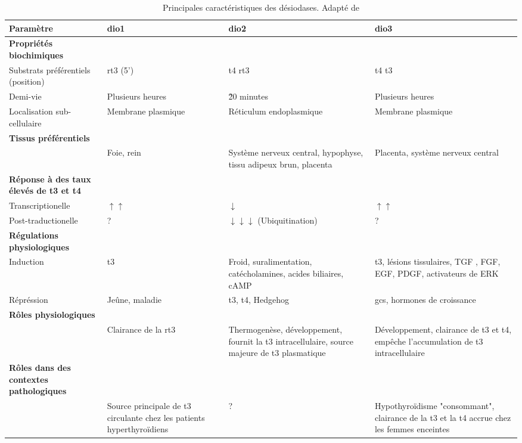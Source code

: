 \begin{sidewaystable}[!htbp]
{
\footnotesize
{}
\begin{tabularx}{\textwidth}{L L L L}

\toprule

\textbf{Paramètre} &
	\textbf{\gls{dio1}} &
	\textbf{\gls{dio2}} &
	\textbf{\gls{dio3}} \\

\midrule

\textbf{Propriétés biochimiques} & ~ & ~ & ~ \\
	Substrats préférentiels (position) &
		\gls{rt3} (5') &
		\gls{t4} \gls{rt3} &
		\gls{t4} \gls{t3} \\
	Demi-vie &
		Plusieurs heures &
		\~ 20 minutes &
		Plusieurs heures \\
	Localisation sub-cellulaire &
		Membrane plasmique &
		Réticulum endoplasmique &
		Membrane plasmique \\
\textbf{Tissus préférentiels} & ~ & ~ & ~ \\
	~ &
		Foie, rein &
		Système nerveux central, hypophyse, tissu adipeux brun, placenta &
		Placenta, système nerveux central \\
\textbf{Réponse à des taux élevés de \gls{t3} et \gls{t4}} & ~ & ~ & ~ \\
	Transcriptionelle &
		$\uparrow \uparrow$ &
		$\downarrow$ &
		$\uparrow \uparrow$ \\
	Post-traductionelle &
		? &
		$\downarrow \downarrow \downarrow$ (Ubiquitination) &
		? \\
\textbf{Régulations physiologiques} & ~ & ~ & ~ \\
	Induction &
		\gls{t3} &
		Froid, suralimentation, catécholamines, acides biliaires, cAMP &
		\gls{t3}, lésions tissulaires, TGF , FGF, EGF, PDGF, activateurs de ERK \\
	Répréssion &
		Jeûne, maladie &
		\gls{t3}, \gls{t4}, Hedgehog &
		\glspl{gc}, hormones de croissance \\
\textbf{Rôles physiologiques} & ~ & ~ & ~ \\
	~ &
		Clairance de la \gls{rt3} &
		Thermogenèse, développement, fournit la \gls{t3} intracellulaire, source majeure de \gls{t3} plasmatique &
		Développement, clairance de \gls{t3} et \gls{t4}, empêche l'accumulation de \gls{t3} intracellulaire \\
\textbf{Rôles dans des contextes pathologiques} & ~ & ~ & ~ \\
	~ &
		Source principale de \gls{t3} circulante chez les patients hyperthyroïdiens &
		? &
		Hypothyroïdisme "consommant", clairance de la \gls{t3} et la \gls{t4} accrue chez les femmes enceintes \\
		
\bottomrule

\end{tabularx}
}
\caption[Principales caractéristiques des désiodases]
{
Principales caractéristiques des désiodases. Adapté de \citet{Bianco2006}
}
\label{tab:desiodases}
\end{sidewaystable}